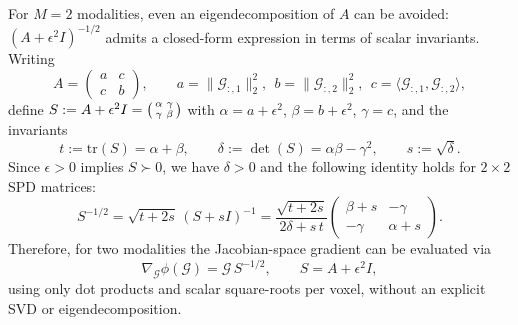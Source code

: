 For $M=2$ modalities, even an eigendecomposition of $A$ can be avoided: $(A+\epsilon^2 I)^{-1/2}$ admits a closed-form expression in terms of scalar invariants. Writing
\begin{equation}
A=
\begin{pmatrix}
a & c\\
c & b
\end{pmatrix},
\qquad
a=\|\mathcal{G}_{:,1}\|_2^2,\ \ b=\|\mathcal{G}_{:,2}\|_2^2,\ \ c=\langle \mathcal{G}_{:,1},\mathcal{G}_{:,2}\rangle,
\end{equation}
define $S:=A+\epsilon^2 I=\begin{psmallmatrix}\alpha & \gamma\\ \gamma & \beta\end{psmallmatrix}$ with $\alpha=a+\epsilon^2$, $\beta=b+\epsilon^2$, $\gamma=c$, and the invariants
\begin{equation}
t:=\mathrm{tr}(S)=\alpha+\beta,
\qquad
\delta:=\det(S)=\alpha\beta-\gamma^2,
\qquad
s:=\sqrt{\delta}.
\end{equation}
Since $\epsilon>0$ implies $S\succ 0$, we have $\delta>0$ and the following identity holds for $2\times2$ SPD matrices:
\begin{equation}\label{eq:inv_sqrt_2x2}
S^{-1/2}
=
\sqrt{t+2s}\,(S+sI)^{-1}
=
\frac{\sqrt{t+2s}}{2\delta+s\,t}
\begin{pmatrix}
\beta+s & -\gamma\\
-\gamma & \alpha+s
\end{pmatrix}.
\end{equation}
Therefore, for two modalities the Jacobian-space gradient can be evaluated via
\begin{equation}\label{eq:2x2_gram}
\nabla_{\mathcal{G}} \phi(\mathcal{G})
=
\mathcal{G}\,S^{-1/2},
\qquad S=A+\epsilon^2 I,
\end{equation}
using only dot products and scalar square-roots per voxel, without an explicit SVD or eigendecomposition.

